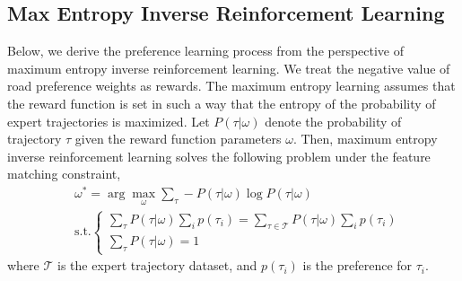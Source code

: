\subsection{Max Entropy Inverse Reinforcement Learning}
\label{apdx:irl}
Below, we derive the preference learning process from the perspective of maximum entropy inverse reinforcement learning. 
We treat the negative value of road preference weights as rewards. The maximum entropy learning assumes that the reward function is set in such a way that the entropy of the probability of expert trajectories is maximized. Let $P(\tau|\omega)$ denote the probability of trajectory $\tau$ given the reward function parameters $\omega$. Then, maximum entropy inverse reinforcement learning solves the following problem under the feature matching constraint,
\begin{equation}
\begin{aligned}
    &\omega^{*} = \arg \max _\omega \sum_\tau -P(\tau|\omega)\log P(\tau | \omega) \\
    &\text{s.t.} \begin{cases}
    \sum_\tau P(\tau | \omega) \sum_i p(\tau_i) = \sum_{\tau\in \mathcal{T}} P(\tau | \omega) \sum_i p(\tau_i)  \\
    \sum_\tau P(\tau | \omega) = 1
    \end{cases}
\end{aligned}
\end{equation}
where $\mathcal{T}$ is the expert trajectory dataset, and $p(\tau_i)$ is the preference for $\tau_i$.

